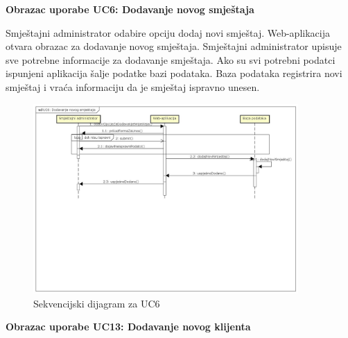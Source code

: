			
			\textbf{Obrazac uporabe UC6: Dodavanje novog smještaja}
			
			Smještajni administrator odabire opciju dodaj novi smještaj. Web-aplikacija otvara obrazac za dodavanje novog smještaja. Smještajni administrator upisuje sve potrebne informacije za dodavanje smještaja. Ako su svi potrebni podatci ispunjeni aplikacija šalje podatke bazi podataka. Baza podataka registrira novi smještaj i vraća informaciju da je smještaj ispravno unesen.
			\begin{figure}[htbp]
				\centering
				\includegraphics[width=0.9\textwidth]{dijagrami/sec_uc6}
				\caption{Sekvencijski dijagram za UC6}
				\label{fig:secUC6}
			\end{figure}
			\eject
			
						
			\textbf{Obrazac uporabe UC13: Dodavanje novog klijenta}
			
